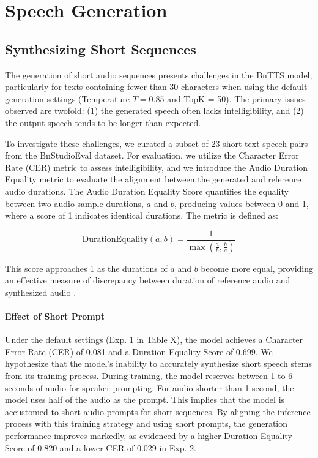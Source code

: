 \section{Speech Generation}
\subsection{Synthesizing Short Sequences}

The generation of short audio sequences presents challenges in the BnTTS model, particularly for texts containing fewer than 30 characters when using the default generation settings (Temperature \(T = 0.85\) and TopK = 50). The primary issues observed are twofold: (1) the generated speech often lacks intelligibility, and (2) the output speech tends to be longer than expected.

To investigate these challenges, we curated a subset of 23 short text-speech pairs from the BnStudioEval dataset. For evaluation, we utilize the Character Error Rate (CER) metric to assess intelligibility, and we introduce the Audio Duration Equality metric to evaluate the alignment between the generated and reference audio durations. The Audio Duration Equality Score quantifies the equality between two audio sample durations, \(a\) and \(b\), producing values between 0 and 1, where a score of 1 indicates identical durations. The metric is defined as:

\begin{equation}
    \text{DurationEquality}(a, b) = \frac{1}{\max\left(\frac{a}{b}, \frac{b}{a}\right)}
\end{equation}



This score approaches 1 as the durations of \(a\) and \(b\) become more equal, providing an effective measure of  discrepancy between duration of reference audio and synthesized audio .


\paragraph{Effect of Short Prompt}
Under the default settings (Exp. 1 in Table X), the model achieves a Character Error Rate (CER) of 0.081 and a Duration Equality Score of 0.699. We hypothesize that the model's inability to accurately synthesize short speech stems from its training process. During training, the model reserves between 1 to 6 seconds of audio for speaker prompting. For audio shorter than 1 second, the model uses half of the audio as the prompt. This implies that the model is accustomed to short audio prompts for short sequences. By aligning the inference process with this training strategy and using short prompts, the generation performance improves markedly, as evidenced by a higher Duration Equality Score of 0.820 and a lower CER of 0.029 in Exp. 2.

